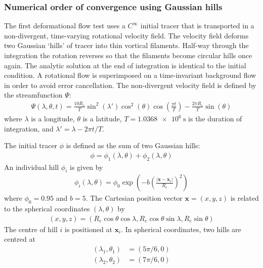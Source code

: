 \subsubsection{Numerical order of convergence using Gaussian hills}
\label{sec:deformationSphere-gaussian-nondiv}

The first deformational flow test uses a $C^\infty$ initial tracer that is transported in a non-divergent, time-varying rotational velocity field.
The velocity field deforms two Gaussian `hills' of tracer into thin vortical filaments.  Half-way through the integration the rotation reverses so that the filaments become circular hills once again.  The analytic solution at the end of integration is identical to the initial condition.
A rotational flow is superimposed on a time-invariant background flow in order to avoid error cancellation.
The non-divergent velocity field is defined by the streamfunction $\Psi$:
\begin{align}
	\Psi(\lambda, \theta, t) = \frac{10 R_e}{T} \sin^2 \left(\lambda'\right) \cos^2 \left(\theta\right) \cos \left( \frac{\pi t}{T} \right) - \frac{2 \pi R_e}{T} \sin\left(\theta\right)
\end{align}
where $\lambda$ is a longitude, $\theta$ is a latitude, $T = \SI{1.0368e6}{\second}$ is the duration of integration, and $\lambda' = \lambda - 2 \pi t / T$.

The initial tracer $\phi$ is defined as the sum of two Gaussian hills:
\begin{align}
	\phi = \phi_1(\lambda, \theta) + \phi_2(\lambda, \theta)
\end{align}
An individual hill $\phi_i$ is given by
\begin{align}
	\phi_i(\lambda, \theta) = \phi_0 \exp\left( -b \left( \frac{|\mathbf{x} - \mathbf{x}_i|}{R_e} \right)^2 \right)
\end{align}
where $\phi_0 = 0.95$ and $b = 5$.  The Cartesian position vector $\mathbf{x} = (x,y,z)$ is related to the spherical coordinates $(\lambda, \theta)$ by
\begin{align}
	(x,y,z) = (R_e \cos \theta \cos \lambda, R_e \cos \theta \sin \lambda, R_e \sin \theta)
\end{align}
The centre of hill $i$ is positioned at $\mathbf{x}_i$.  In spherical coordinates, two hills are centred at
\begin{align}
	(\lambda_1,\theta_1) &= (5 \pi /6, 0) \\
	(\lambda_2,\theta_2) &= (7 \pi /6, 0)
\end{align}

